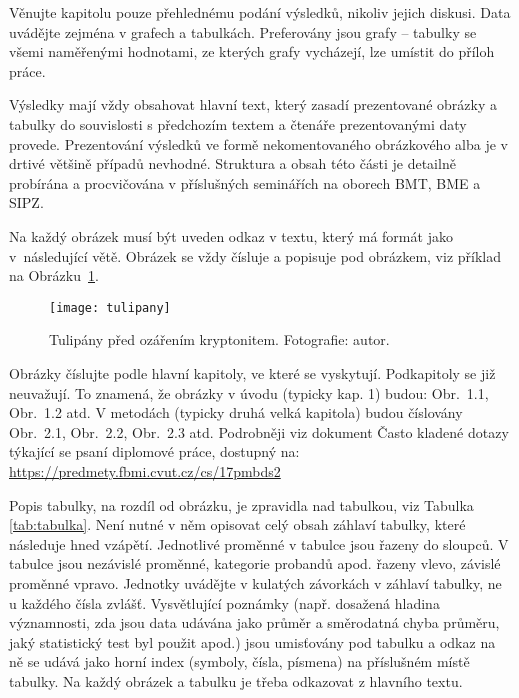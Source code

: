 Věnujte kapitolu pouze přehlednému podání výsledků, nikoliv jejich diskusi. 
Data uvádějte zejména v grafech a tabulkách. 
Preferovány jsou grafy – tabulky se všemi naměřenými hodnotami, ze kterých grafy vycházejí, lze umístit do příloh práce.

Výsledky mají vždy obsahovat hlavní text, který zasadí prezentované obrázky a tabulky do souvislosti s předchozím textem a čtenáře prezentovanými daty provede. 
Prezentování výsledků ve formě nekomentovaného obrázkového alba je v drtivé většině případů nevhodné.
Struktura a obsah této části je detailně probírána a procvičována v příslušných seminářích na oborech BMT, BME a SIPZ.

Na každý obrázek musí být uveden odkaz v textu, který má formát jako v~ná\-sle\-du\-jí\-cí větě. 
Obrázek se vždy čísluje a popisuje pod obrázkem, viz příklad na Obrázku~\ref{img:tulipany}.

\begin{figure}[h]
	\label{img:tulipany}
	\begin{center}
		\texttt{[image: tulipany]}
		\caption{Tulipány před ozářením kryptonitem. Fotografie: autor.}
	\end{center}
\end{figure}
 
 
Obrázky číslujte podle hlavní kapitoly, ve které se vyskytují. Podkapitoly se již neuvažují. 
To znamená, že obrázky v úvodu (typicky kap. 1) budou: Obr.~1.1, Obr.~1.2 atd. V metodách (typicky druhá velká kapitola) budou číslovány Obr.~2.1, Obr.~2.2, Obr.~2.3 atd. 
Podrobněji viz dokument Často kladené dotazy týkající se psaní diplomové práce, dostupný na:
\url{https://predmety.fbmi.cvut.cz/cs/17pmbds2}

Popis tabulky, na rozdíl od obrázku, je zpravidla nad tabulkou, viz Tabulka \ref{tab:tabulka}. 
Není nutné v něm opisovat celý obsah záhlaví tabulky, které následuje hned vzápětí. 
Jednotlivé proměnné v tabulce jsou řazeny do sloupců. 
V tabulce jsou nezávislé proměnné, kategorie probandů apod. řazeny vlevo, závislé proměnné vpravo. 
Jednotky uvádějte v kulatých závorkách v záhlaví tabulky, ne u každého čísla zvlášť. 
Vysvětlující poznámky (např. dosažená hladina významnosti, zda jsou data udávána jako průměr a směrodatná chyba průměru, jaký statistický test byl použit apod.) jsou umisťovány pod tabulku a odkaz na ně se udává jako horní index (symboly, čísla, písmena) na příslušném místě tabulky. 
Na každý obrázek a tabulku je třeba odkazovat z hlavního textu.

